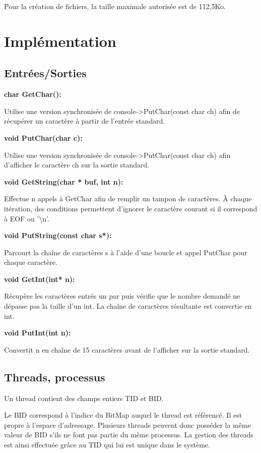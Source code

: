 \documentclass[12pt]{report}
\begin{document}
Pour la création de fichiers, la taille maximale autorisée est de 112,5Ko.


\chapter{Implémentation}

\section{Entrées/Sorties}

\textbf{char GetChar():} 

Utilise une version synchronisée de console->PutChar(const char ch)
afin de récupérer un caractère à partir de l'entrée standard.

\bigskip

\textbf{void PutChar(char c):} 

Utilise une version synchronisée de console->PutChar(const char ch)
afin d'afficher le caractère ch sur la sortie standard.
\bigskip


\textbf{void GetString(char * buf, int n):} 

Effectue n appels à GetChar afin de remplir un tampon de caractères.
À chaque itération, des conditions permettent d'ignorer le caractère courant si
il correspond à EOF ou '\textbackslash n'.

\bigskip

\textbf{void PutString(const char s*):}

Parcourt la chaîne de caractères s à l'aide d'une boucle et appel PutChar pour chaque caractère.
\bigskip	
	

\textbf{void GetInt(int* n):}	
	
Récupère les caractères entrés un par puis vérifie que le nombre demandé ne dépasse pas la taille d'un int.
La chaîne de caractères résultante est convertie en int.
\bigskip


\textbf{void PutInt(int n):}

Convertit n en chaîne de 15 caractères avant de l'afficher sur la sortie standard.
\bigskip	


\section{Threads, processus}

Un thread contient des champs entiers TID et BID.

Le BID correspond à l'indice du BitMap auquel le thread est référencé. Il est propre à l'espace d'adressage. Plusieurs threads peuvent donc posséder la même valeur de BID s'ils ne font pas partie du même processus. La gestion des threads est ainsi effectuée grâce au TID qui lui est unique dans le système.
\end{document}
